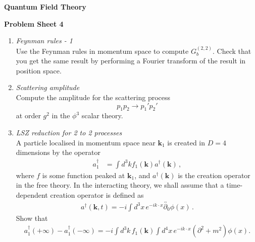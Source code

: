 \documentclass[12pt,a4paper]{article}
\begin{document}
\begin{center}
{\bf Quantum Field Theory}\\[\baselineskip]
\end{center}
{\bf Problem Sheet 4}

\begin{enumerate}
  \item {\it Feynman rules - 1}\\

    Use the Feynman rules in momentum space to compute
    $G^{(2,2)}_b$. Check that you get the same result by performing a
    Fourier transform of the result in position space.

    \bigskip

  \item {\it Scattering amplitude} \\
    
      Compute the amplitude for the scattering process
      \[
        p_1 p_2 \longrightarrow p_1' p_2'
      \]
      at order $g^2$ in the $\phi^3$ scalar theory. 


    \bigskip
    
  \item {\it LSZ reduction for 2 to 2 processes}\\
    
    A particle localised in momentum space near $\mathbf{k}_1$ is
    created in $D=4$ dimensions by the operator
    \begin{align}
      \label{eq:1}
      a_1^\dagger &= \int d^3k  f_1(\mathbf{k}) a^\dagger(\mathbf{k})\, ,
    \end{align}
    where $f$ is some function peaked at $\mathbf{k}_1$, and
    $a^\dagger(\mathbf{k})$ is the creation operator in the free
    theory. In the interacting theory, we shall assume that a
    time-dependent creation operator is defined as
    \begin{align}
      \label{eq:2}
      a^\dagger(\mathbf{k},t) = -i \int d^3x\, e^{-ik\cdot x}
      \overleftrightarrow{\partial_0} \phi(x)\, .
    \end{align}
    Show that
    \begin{align}
      \label{eq:3}
      a_1^\dagger(+\infty) - a_1^\dagger(-\infty) = 
      -i \int d^3k\, f_1(\mathbf{k}) \int d^4x\,
      e^{-ik\cdot x} (\partial^2+m^2) \phi(x).
    \end{align}
 

\end{enumerate}
\end{document}
